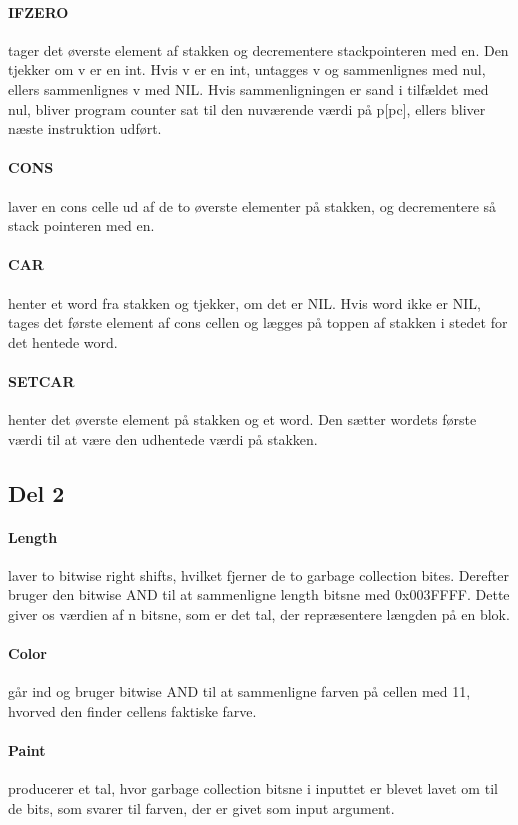 \paragraph{IFZERO} tager det øverste element af stakken og decrementere stackpointeren med en. Den tjekker om v er en int. Hvis v er en int, untagges v og sammenlignes med nul, ellers sammenlignes v med NIL. Hvis sammenligningen er sand i tilfældet med nul, bliver program counter sat til den nuværende værdi på p[pc], ellers bliver næste instruktion udført.
\paragraph{CONS} laver en cons celle ud af de to øverste elementer på stakken, og decrementere så stack pointeren med en.
\paragraph{CAR} henter et word fra stakken og tjekker, om det er NIL. Hvis word ikke er NIL, tages det første element af cons cellen og lægges på toppen af stakken i stedet for det hentede word.
\paragraph{SETCAR} henter det øverste element på stakken og et word. Den sætter wordets første værdi til at være den udhentede værdi på stakken.

\subsection{Del 2}
\label{O1_2}
\paragraph{Length} laver to bitwise right shifts, hvilket fjerner de to garbage collection bites. Derefter bruger den bitwise AND til at sammenligne length bitsne med 0x003FFFF. Dette giver os værdien af n bitsne, som er det tal, der repræsentere længden på en blok.
\paragraph{Color} går ind og bruger bitwise AND til at sammenligne farven på cellen med 11, hvorved den finder cellens faktiske farve.
\paragraph{Paint} producerer et tal, hvor garbage collection bitsne i inputtet er blevet lavet om til de bits, som svarer til farven, der er givet som input argument.


